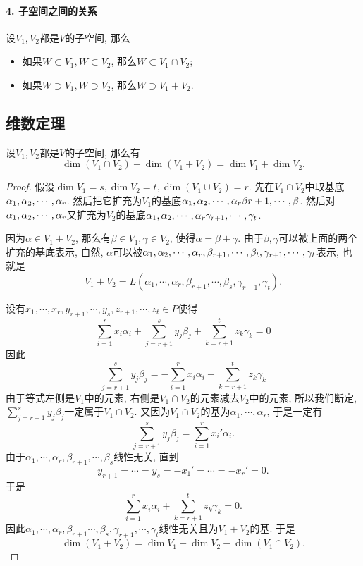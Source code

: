 \documentclass{ctexart}
\begin{document}
\paragraph{4. 子空间之间的关系} 设$V_1, V_2$都是$V$的子空间, 那么
\begin{itemize}
    \item 如果$W\subset V_1, W\subset V_2$, 那么$W \subset V_1 \cap V_2$;
    \item 如果$W\supset V_1,W\supset V_2$, 那么$W\supset V_1+V_2$. 
\end{itemize}

\subsection{维数定理}

\begin{theorem}
    设$V_1,V_2$都是$V$的子空间, 那么有
    \[
    \dim(V_{1}\cap V_{2})+\dim(V_{1}+V_{2})=\dim V_{1}+\dim V_{2}.
    \]
\end{theorem}

\begin{proof}
    假设$\dim V_1=s,\dim V_2=t, \dim (V_1\cup V_2)=r$. 先在$V_1 \cap V_2$中取基底${{\alpha}_1, {\alpha}_2,\cdots, {\alpha}_{r}}$. 然后把它扩充为$V_1$的基底${{\alpha}_1, {\alpha}_2,\cdots, {\alpha}_{r}} \beta{r+1},\cdots, \beta$. 然后对${{\alpha}_1, {\alpha}_2,\cdots, {\alpha}_{r}}$又扩充为$V_2$的基底${{\alpha}_1, {\alpha}_2,\cdots, {\alpha}_{r}} \gamma_{r+1},\cdots, \gamma_t$. 

    因为$\alpha\in V_1+V_2$, 那么有$\beta\in V_1,\gamma\in V_2$, 使得$\alpha=\beta+\gamma$. 由于$\beta,\gamma$可以被上面的两个扩充的基底表示, 自然, $\alpha$可以被${{\alpha}_1, {\alpha}_2,\cdots, {\alpha}_{r}}, \beta_{r+1},\cdots, \beta_{t},\gamma_{r+1},\cdots, \gamma_t$表示, 也就是
    \[
        V_1+V_2=L(\alpha_1,\cdots, \alpha_r, \beta_{r+1},\cdots, \beta_s,\gamma_{r+1},\gamma_t).
    \]

    设有$x_1, \cdots, x_r, y_{r+1}, \cdots, y_s, z_{r+1},\cdots,z_t\in P$使得
    \[
        \sum_{i=1}^{r}x_i\alpha_i + \sum_{j=r+1}^{s} y_j\beta_j + \sum_{k=r+1}^{t}z_k\gamma_k=0
    \]
    因此
    \[
       \sum_{j=r+1}^{s} y_j\beta_j =- \sum_{i=1}^{r}x_i\alpha_i-  \sum_{k=r+1}^{t}z_k\gamma_k
    \]
    由于等式左侧是$V_1$中的元素, 右侧是$V_1\cap V_2$的元素减去$V_2$中的元素, 所以我们断定,  $\sum_{j=r+1}^{s} y_j\beta_j$一定属于$V_1\cap V_2$. 又因为$V_1\cap V_2$的基为$\alpha_1,\cdots, \alpha_r$, 于是一定有
    \[
        \sum_{j=r+1}^{s}y_j\beta_j=\sum_{i=1}^{r}x_i'\alpha_i.
    \]
    由于$\alpha_1,\cdots, \alpha_r,\beta_{r+1},\cdots, \beta_s$线性无关, 直到
    \[
        y_{r+1}=\cdots=y_s=-x_1'=\cdots=-x_r'=0.
    \]
    于是
    \[
        \sum_{i=1}^{r}x_i\alpha_i+\sum_{k=r+1}^{t}z_k\gamma_k=0.
    \]
    因此$\alpha_1,\cdots,\alpha_r,\beta_{r+1}\cdots,\beta_s,\gamma_{r+1},\cdots,\gamma_t$线性无关且为$V_1+V_2$的基. 于是
    \[
        \dim (V_1+V_2)=\dim V_1+\dim V_2-\dim(V_1\cap V_2).
    \]
\end{proof}
\end{document}
